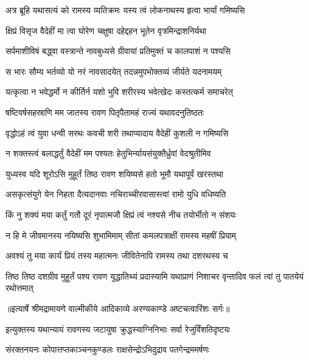\twolineshloka
{अत्र ब्रूहि यथासत्यं को रामस्य व्यतिक्रमः}
{यस्य त्वं लोकनाथस्य हृत्वा भार्यां गमिष्यसि} %

\twolineshloka
{क्षिप्रं विसृज वैदेहीं मा त्वा घोरेण चक्षुषा}
{दहेद्दहन भूतेन वृत्रमिन्द्राशनिर्यथा} %

\twolineshloka
{सर्पमाशीविषं बद्ध्वा वस्त्रान्ते नावबुध्यसे}
{ग्रीवायां प्रतिमुक्तं च कालपाशं न पश्यसि} %

\twolineshloka
{स भारः सौम्य भर्तव्यो यो नरं नावसादयेत्}
{तदन्नमुपभोक्तव्यं जीर्यते यदनामयम्} %

\twolineshloka
{यत्कृत्वा न भवेद्धर्मो न कीर्तिर्न यशो भुवि}
{शरीरस्य भवेत्खेदः कस्तत्कर्म समाचरेत्} %

\twolineshloka
{षष्टिवर्षसहस्राणि मम जातस्य रावण}
{पितृपैतामहं राज्यं यथावदनुतिष्ठतः} %

\twolineshloka
{वृद्धोऽहं त्वं युवा धन्वी सरथः कवची शरी}
{तथाप्यादाय वैदेहीं कुशली न गमिष्यसि} %

\twolineshloka
{न शक्तस्त्वं बलाद्धर्तुं वैदेहीं मम पश्यतः}
{हेतुभिर्न्यायसंयुक्तैर्ध्रुवां वेदश्रुतीमिव} %

\twolineshloka
{युध्यस्व यदि शूरोऽसि मुहूर्तं तिष्ठ रावण}
{शयिष्यसे हतो भूमौ यथापूर्वं खरस्तथा} %

\twolineshloka
{असकृत्संयुगे येन निहता दैत्यदानवाः}
{नचिराच्चीरवासास्त्वां रामो युधि वधिष्यति} %

\twolineshloka
{किं नु शक्यं मया कर्तुं गतौ दूरं नृपात्मजौ}
{क्षिप्रं त्वं नश्यसे नीच तयोर्भीतो न संशयः} %

\twolineshloka
{न हि मे जीवमानस्य नयिष्यसि शुभामिमाम्}
{सीतां कमलपत्राक्षीं रामस्य महषीं प्रियाम्} %

\twolineshloka
{अवश्यं तु मया कार्यं प्रियं तस्य महात्मनः}
{जीवितेनापि रामस्य तथा दशरथस्य च} %

\threelineshloka
{तिष्ठ तिष्ठ दशग्रीव मुहूर्तं पश्य रावण}
{युद्धातिथ्यं प्रदास्यामि यथाप्राणं निशाचर}
{वृन्तादिव फलं त्वां तु पातयेयं रथोत्तमात्} %


{॥इत्यार्षे श्रीमद्रामायणे वाल्मीकीये आदिकाव्ये अरण्यकाण्डे अष्टचत्वारिंशः सर्गः॥}


\twolineshloka
{इत्युक्तस्य यथान्यायं रावणस्य जटायुषा}
{क्रुद्धस्याग्निनिभाः सर्वा रेजुर्विंशतिदृष्टयः} %

\twolineshloka
{संरक्तनयनः कोपात्तप्तकाञ्चनकुण्डलः}
{राक्षसेन्द्रोऽभिदुद्राव पतगेन्द्रममर्षणः} %

